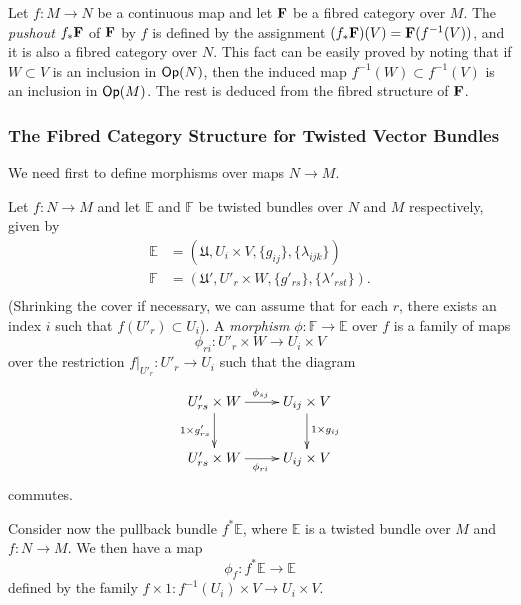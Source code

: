 \begin{ej}\label{fcex_9}
Let $f:M\to N$ be a continuous map and let ${\bf F}$ be a fibred category over $M$. The \emph{pushout} $f_*{\bf F}$ of ${\bf F}$ by $f$ is defined by the assignment $(f_*{\bf F})(V)={\bf F}(f^{-1}(V))$, and it is also a fibred category over $N$. This fact can be easily proved by noting that if  $W\subset V$ is an inclusion in $\mathsf{Op}(N)$, then the induced map $f^{-1}(W)\subset f^{-1}(V)$ is an inclusion in $\mathsf{Op}(M)$. The rest is deduced from the fibred structure of ${\bf F}$.
\end{ej}



\subsubsection{The Fibred Category Structure for Twisted Vector Bundles}

We need first to define morphisms over maps $N\to M$.

\begin{defi}\label{arrows}
Let $f:N\to M$ and let $\mathbb{E}$ and $\mathbb{F}$ be twisted bundles over $N$ and $M$ respectively, given by
$$
\begin{aligned}
\mathbb{E} &= (\mathfrak{U},U_i\times V,\{g_{ij}\},\{\lambda_{ijk}\}) \\
\mathbb{F} &=(\mathfrak{U}',U'_r\times W,\{g'_{rs}\},\{\lambda'_{rst}\}). \\
\end{aligned}
$$
(Shrinking the cover if necessary, we can assume that for each $r$, there exists an index $i$ such that $f(U'_r)\subset U_i$). A \emph{morphism} $\phi :\mathbb{F}\to \mathbb{E}$ over $f$ is a family of maps
$$\phi_{ri}:U'_r\times W\longrightarrow U_i\times V$$
over the restriction $f|_{U'_r}:U'_r\to U_i$ such that the diagram
\begin{equation}
\xymatrix{
U'_{rs}\times W \ar[r]^{\phi_{sj}} \ar[d]_{1\times g'_{rs}} & U_{ij}\times V \ar[d]^{1\times g_{ij}} \\
U'_{rs}\times W \ar[r]_{\phi_{ri}} & U_{ij}\times V}
\end{equation}
commutes.
\end{defi}

Consider now the pullback bundle $f^*\mathbb{E}$, where $\mathbb{E}$ is a twisted bundle over $M$ and $f:N\to M$. We then have a map
$$\phi_f:f^*\mathbb{E}\longrightarrow \mathbb{E}$$
defined by the family $f\times 1:f^{-1}(U_i)\times V\to U_i\times V$.

